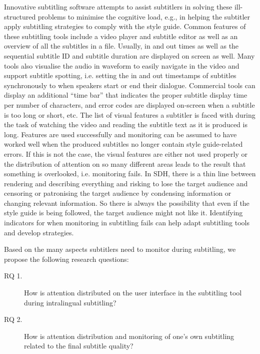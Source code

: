 \documentclass[output=paper]{langscibook}
\begin{document}
Innovative subtitling software attempts to assist subtitlers in solving these ill-structured problems to minimise the cognitive load, e.g., in helping the subtitler apply subtitling strategies to comply with the style guide.
Common features of these subtitling tools include a video player and subtitle editor as well as an overview of all the subtitles in a file.
Usually, in and out times as well as the sequential subtitle ID and subtitle duration are displayed on screen as well.
Many tools also visualise the audio in waveform to easily navigate in the video and support subtitle spotting, i.e. setting the in and out timestamps of subtitles synchronously to when speakers start or end their dialogue.
Commercial tools can display an additional ``time bar'' that indicates the proper subtitle display time per number of characters, and error codes are displayed on-screen when a subtitle is too long or short, etc.
The list of visual features a subtitler is faced with during the task of watching the video and reading the subtitle text as it is produced is long.
Features are used successfully and monitoring can be assumed to have worked well when the produced subtitles no longer contain style guide-related errors.
If this is not the case, the visual features are either not used properly or the distribution of attention on so many different areas leads to the result that something is overlooked, i.e. monitoring fails.
In SDH, there is a thin line between rendering and describing everything and risking to lose the target audience and censoring or patronising the target audience by condensing information or changing relevant information.
So there is always the possibility that even if the style guide is being followed, the target audience might not like it.
Identifying indicators for when monitoring in subtitling fails can help adapt subtitling tools and develop strategies.

Based on the many aspects subtitlers need to monitor during subtitling, we propose the following research questions:

\begin{description}
  \item[RQ 1.] How is attention distributed on the user interface in the subtitling tool during intralingual subtitling?
  \item[RQ 2.] How is attention distribution and monitoring of one's own subtitling related to the final subtitle quality?
\end{description}
\end{document}
